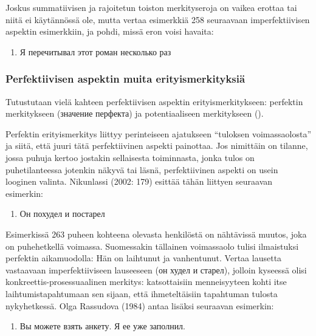 \documentclass[]{scrartcl}
\providecommand{\tightlist}{%
  \setlength{\itemsep}{0pt}\setlength{\parskip}{0pt}}
\begin{document}
Joskus summatiivisen ja rajoitetun toiston merkityseroja on vaikea
erottaa tai niitä ei käytännössä ole, mutta vertaa esimerkkiä 258
seuraavaan imperfektiivisen aspektin esimerkkiin, ja pohdi, missä eron
voisi havaita:

\begin{enumerate}
\def\labelenumi{(\arabic{enumi})}
\setcounter{enumi}{261}
\tightlist
\item
  Я перечитывал этот роман несколько раз
\end{enumerate}

\subsubsection{Perfektiivisen aspektin muita
erityismerkityksiä}\label{perfektiivisen-aspektin-muita-erityismerkityksiuxe4}

Tutustutaan vielä kahteen perfektiivisen aspektin erityismerkitykseen:
perfektin merkitykseen (значение перфекта) ja potentiaaliseen
merkitykseen ().

Perfektin erityismerkitys liittyy perinteiseen ajatukseen ``tuloksen
voimassaolosta'' ja siitä, että juuri tätä perfektiivinen aspekti
painottaa. Jos nimittäin on tilanne, jossa puhuja kertoo jostakin
sellaisesta toiminnasta, jonka tulos on puhetilanteessa jotenkin näkyvä
tai läsnä, perfektiivinen aspekti on usein looginen valinta. Nikunlassi
(2002: 179) esittää tähän liittyen seuraavan esimerkin:

\begin{enumerate}
\def\labelenumi{(\arabic{enumi})}
\setcounter{enumi}{262}
\tightlist
\item
  Он похудел и постарел
\end{enumerate}

Esimerkissä 263 puheen kohteena olevasta henkilöstä on nähtävissä
muutos, joka on puhehetkellä voimassa. Suomessakin tällainen voimassaolo
tulisi ilmaistuksi perfektin aikamuodolla: Hän on laihtunut ja
vanhentunut. Vertaa lausetta vastaavaan imperfektiiviseen lauseeseen (он
худел и старел), jolloin kyseessä olisi konkreettis-prosessuaalinen
merkitys: katsottaisiin menneisyyteen kohti itse laihtumistapahtumaan
sen sijaan, että ihmeteltäisiin tapahtuman tulosta nykyhetkessä. Olga
Rassudova (1984) antaa lisäksi seuraavan esimerkin:

\begin{enumerate}
\def\labelenumi{(\arabic{enumi})}
\setcounter{enumi}{263}
\tightlist
\item
  Вы можете взять анкету. Я ее уже заполнил.
\end{enumerate}
\end{document}

